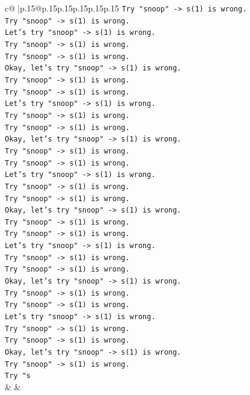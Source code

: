 \documentclass{article}
\begin{document}
{\begin{supertabular}{c@{$\;$}|p{.15\linewidth}@{}p{.15\linewidth}p{.15\linewidth}p{.15\linewidth}p{.15\linewidth}p{.15\linewidth}}
{{{\texttt{Try "snoop" {-}> s(1) is wrong.} \\
\texttt{Try "snoop" {-}> s(1) is wrong.} \\
\texttt{Let's try "snoop" {-}> s(1) is wrong.} \\
\texttt{Try "snoop" {-}> s(1) is wrong.} \\
\texttt{Try "snoop" {-}> s(1) is wrong.} \\
\texttt{Okay, let's try "snoop" {-}> s(1) is wrong.} \\
\texttt{Try "snoop" {-}> s(1) is wrong.} \\
\texttt{Try "snoop" {-}> s(1) is wrong.} \\
\texttt{Let's try "snoop" {-}> s(1) is wrong.} \\
\texttt{Try "snoop" {-}> s(1) is wrong.} \\
\texttt{Try "snoop" {-}> s(1) is wrong.} \\
\texttt{Okay, let's try "snoop" {-}> s(1) is wrong.} \\
\texttt{Try "snoop" {-}> s(1) is wrong.} \\
\texttt{Try "snoop" {-}> s(1) is wrong.} \\
\texttt{Let's try "snoop" {-}> s(1) is wrong.} \\
\texttt{Try "snoop" {-}> s(1) is wrong.} \\
\texttt{Try "snoop" {-}> s(1) is wrong.} \\
\texttt{Okay, let's try "snoop" {-}> s(1) is wrong.} \\
\texttt{Try "snoop" {-}> s(1) is wrong.} \\
\texttt{Try "snoop" {-}> s(1) is wrong.} \\
\texttt{Let's try "snoop" {-}> s(1) is wrong.} \\
\texttt{Try "snoop" {-}> s(1) is wrong.} \\
\texttt{Try "snoop" {-}> s(1) is wrong.} \\
\texttt{Okay, let's try "snoop" {-}> s(1) is wrong.} \\
\texttt{Try "snoop" {-}> s(1) is wrong.} \\
\texttt{Try "snoop" {-}> s(1) is wrong.} \\
\texttt{Let's try "snoop" {-}> s(1) is wrong.} \\
\texttt{Try "snoop" {-}> s(1) is wrong.} \\
\texttt{Try "snoop" {-}> s(1) is wrong.} \\
\texttt{Okay, let's try "snoop" {-}> s(1) is wrong.} \\
\texttt{Try "snoop" {-}> s(1) is wrong.} \\
\texttt{Try "s} \\
            }
        }
    }
    & & \\ \\


\end{supertabular}}
\end{document}
